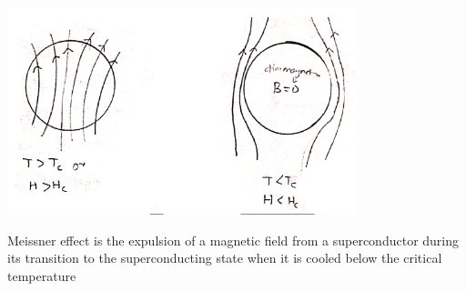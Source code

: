 \documentclass[12pt, a4paper]{article}
\begin{document}

\includegraphics[max width=.8\linewidth]{meissner}

Meissner effect is the expulsion of a magnetic field from a superconductor during its transition to the superconducting state when it is cooled below the critical temperature

\end{document}
